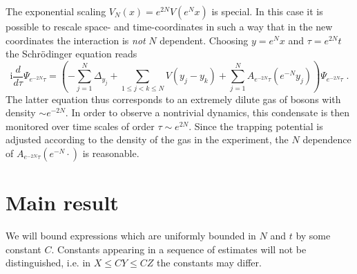 \documentclass[11pt, english, american]{article}
\newcommand{\im}{\text{i}}
\begin{document}
The exponential scaling $V_N(x)= e^{2N} V(e^N x)$ is special. In this case it is possible to rescale space- and time-coordinates in such a way that in the new coordinates  the interaction is {\it not} $N$ dependent. Choosing $y=e^Nx$ and $\tau= e^{2N}t$ the Schr\"odinger equation reads
$$
\im\frac{d}{d\tau} \Psi_{e^{-2N}\tau}=\left(-\sum_{j=1}^N \Delta_{y_j}+\sum_{1\leq  j< k\leq  N} V(y_j-y_k) +\sum _{j=1}^N A_{e^{-2N}\tau}(e^{-N}y_j)\right)\Psi_{e^{-2N}\tau}\;.
$$
The latter equation thus corresponds to an extremely dilute gas of bosons with density $\sim e^{-2N}$. In order to observe a nontrivial dynamics, this condensate is then monitored over time scales of order $\tau \sim e^{2N}$.
Since the trapping potential is adjusted according to the density of the gas in the experiment,  the $N$ dependence of  $A_{e^{-2N}\tau}(e^{-N} \cdot)$ is reasonable.






\section{Main result}

We will bound  expressions which are uniformly bounded in $N$ and $t$ by some constant $C$.
Constants
 appearing in a sequence of estimates will not be distinguished, i.e. in $X\leq  CY\leq  CZ$ the constants may differ.
 
\end{document}
